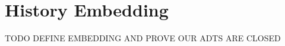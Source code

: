 \section{History Embedding}
\label{sec:embedding}

TODO DEFINE EMBEDDING AND PROVE OUR ADTS ARE CLOSED
